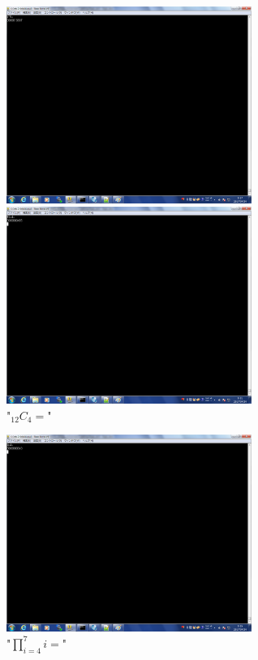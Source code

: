 \documentclass{jsarticle}
\begin{document}
\begin{figure}[htbp]
 \begin{minipage}{0.5\hsize}
  \begin{center}
  \includegraphics[width=8cm,bb=0 0 1280 1024]{7^5.png}
  \end{center}
  \caption{"$7^5=$"}
 \end{minipage}
 \begin{minipage}{0.5\hsize}
  \begin{center}
   \includegraphics[width=8cm,bb=0 0 1280 1024]{12c4.png}
  \end{center}
  \caption{"${}_{12} C _4=$"}
 \end{minipage}
\end{figure}


\begin{figure}[htbp]
 \begin{minipage}{0.5\hsize}
  \begin{center}
  \includegraphics[width=8cm,bb=0 0 1280 1024]{7p4.png}
  \end{center}
  \caption{"$\prod_{i=4}^{7} i=$"}
 \end{minipage}
\end{figure}
\end{document}
